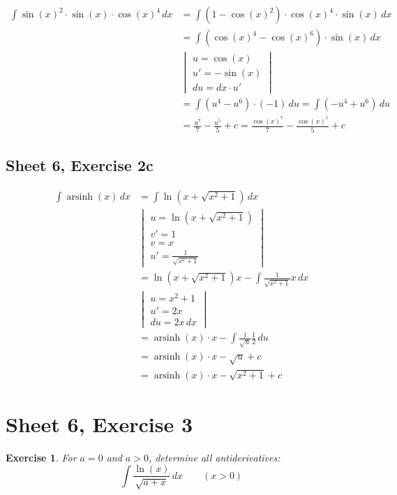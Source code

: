 \documentclass{article}
\newtheorem{ex}{Exercise} %
\begin{document}
\begin{align*}
  \int \sin(x)^2 \cdot \sin(x) \cdot \cos(x)^4 \, dx
    &= \int (1 - \cos(x)^2) \cdot \cos(x)^4 \cdot \sin(x) \, dx \\
    &= \int (\cos(x)^4 - \cos(x)^6) \cdot \sin(x) \, dx \\
    &\begin{vmatrix} u = \cos(x) \\ u' = -\sin(x) \\ du = dx \cdot u' \end{vmatrix} \\
    &= \int (u^4 - u^6) \cdot (-1) \, du = \int (-u^4 + u^6) \, du \\
    &= \frac{u^7}{7} - \frac{u^5}{5} + c = \frac{\cos(x)^7}{7} - \frac{\cos(x)^5}{5} + c
\end{align*}

\subsection{Sheet 6, Exercise 2c}

\begin{align*}
  \int \operatorname{arsinh}(x) \, dx
    &= \int \ln(x + \sqrt{x^2 + 1}) \, dx \\
    &\begin{vmatrix} u = \ln(x + \sqrt{x^2+1}) \\ v' = 1 \\ v = x \\ u' = \frac{1}{\sqrt{x^2 + 1}} \end{vmatrix} \\
    &= \ln(x + \sqrt{x^2 + 1}) x - \int \frac{1}{\sqrt{x^2 + 1}} x \, dx \\
    &\begin{vmatrix} u = x^2 + 1 \\ u' = 2x \\ du = 2x \, dx \end{vmatrix} \\
    &= \operatorname{arsinh}(x) \cdot x - \int \frac1{\sqrt{u}} \frac12 \, du \\
    &= \operatorname{arsinh}(x) \cdot x - \sqrt{u} + c \\
    &= \operatorname{arsinh}(x) \cdot x - \sqrt{x^2 + 1} + c
\end{align*}

\section{Sheet 6, Exercise 3}
\begin{ex}
  For $a = 0$ and $a > 0$, determine all antiderivatives:
  \[ \int \frac{\ln(x)}{\sqrt{a + x}} \, dx \qquad (x > 0) \]
\end{ex}
\end{document}
